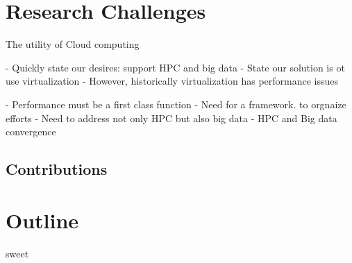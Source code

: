 \section{Research Challenges}
\label{sec:chall}

The utility of Cloud computing


- Quickly state our desires: support HPC and big data
- State our solution is ot use virtualization
- However, historically virtualization has performance issues



- Performance must be a first class function
- Need for a framework.  to orgnaize efforts
- Need to address not only HPC but also big data
- HPC and Big data convergence 


\subsection{Contributions}



\section{Outline}
\label{sec:outline}
sweet
